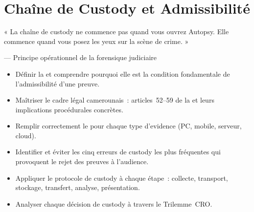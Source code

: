 
\chapter{Chaîne de Custody et Admissibilité}
\label{chap:custody}

\epigraph{%
    « La chaîne de custody ne commence pas quand vous ouvrez Autopsy.
    Elle commence quand vous posez les yeux sur la scène de crime. »%
}{--- Principe opérationnel de la forensique judiciaire}


\begin{boxobjectifs}
\begin{itemize}
    \item Définir la  et comprendre pourquoi
          elle est la condition fondamentale de l'admissibilité d'une preuve.
    \item Maîtriser le cadre légal camerounais~: articles~52--59 de la
           et leurs implications procédurales concrètes.
    \item Remplir correctement le 
          pour chaque type d'evidence (PC, mobile, serveur, cloud).
    \item Identifier et éviter les cinq erreurs de custody les plus
          fréquentes qui provoquent le rejet des preuves à l'audience.
    \item Appliquer le protocole de custody à chaque étape~:
          collecte, transport, stockage, transfert, analyse, présentation.
    \item Analyser chaque décision de custody à travers le Trilemme~CRO.
\end{itemize}
\end{boxobjectifs}

